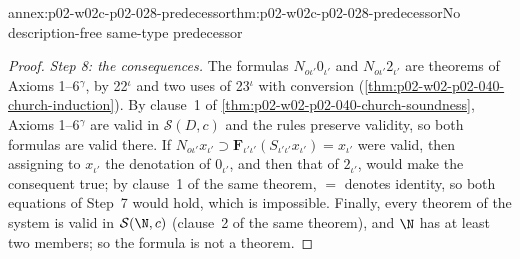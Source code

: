 \begin{annexitem}{annex:p02-w02c-p02-028-predecessor}{thm:p02-w02c-p02-028-predecessor}{No description-free same-type predecessor}
\begin{proof}
\emph{Step 8: the consequences.}  The formulas
\(N_{o\iota'}0_{\iota'}\) and \(N_{o\iota'}2_{\iota'}\) are theorems of
Axioms 1--6\(^\gamma\), by 22\(^\iota\) and two uses of 23\(^\iota\) with
conversion (\cref{thm:p02-w02-p02-040-church-induction}).  By clause~1 of
\cref{thm:p02-w02-p02-040-church-soundness}, Axioms 1--6\(^\gamma\) are valid
in \(\mathcal S(D,c)\) and the rules preserve validity, so both formulas
are valid there.  If
\(N_{o\iota'}x_{\iota'}\supset\mathbf F_{\iota'\iota'}(S_{\iota'\iota'}x_{\iota'})=x_{\iota'}\)
were valid, then assigning to \(x_{\iota'}\) the denotation of
\(0_{\iota'}\), and then that of \(2_{\iota'}\), would make the consequent
true; by clause~1 of the same theorem, \(=\) denotes identity, so both
equations of Step~7 would hold, which is impossible.  Finally, every
theorem of the system is valid in \(\mathcal S(\N,c)\) (clause~2 of the
same theorem), and \(\N\) has at least two members; so the formula is not a
theorem.
\end{proof}
\end{annexitem}

